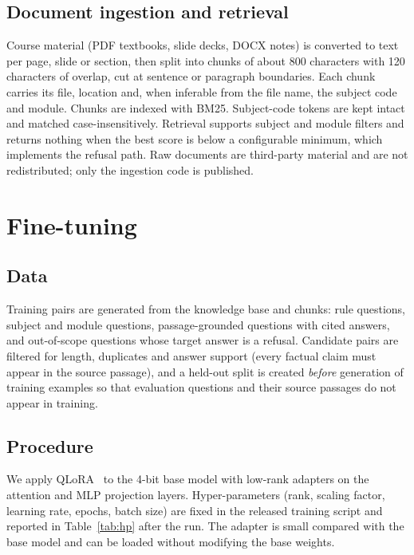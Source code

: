 \documentclass[conference]{IEEEtran}
\begin{document}
\subsection{Document ingestion and retrieval}
Course material (PDF textbooks, slide decks, DOCX notes) is converted to text per page, slide or section, then split into chunks of about 800 characters with 120 characters of overlap, cut at sentence or paragraph boundaries. Each chunk carries its file, location and, when inferable from the file name, the subject code and module. Chunks are indexed with BM25. Subject-code tokens are kept intact and matched case-insensitively. Retrieval supports subject and module filters and returns nothing when the best score is below a configurable minimum, which implements the refusal path. Raw documents are third-party material and are not redistributed; only the ingestion code is published.

\section{Fine-tuning}
\subsection{Data}
Training pairs are generated from the knowledge base and chunks: rule questions, subject and module questions, passage-grounded questions with cited answers, and out-of-scope questions whose target answer is a refusal. Candidate pairs are filtered for length, duplicates and answer support (every factual claim must appear in the source passage), and a held-out split is created \emph{before} generation of training examples so that evaluation questions and their source passages do not appear in training.

\subsection{Procedure}
We apply QLoRA~\cite{dettmers2023qlora} to the 4-bit base model with low-rank adapters on the attention and MLP projection layers. Hyper-parameters (rank, scaling factor, learning rate, epochs, batch size) are fixed in the released training script and reported in Table~\ref{tab:hp} after the run. The adapter is small compared with the base model and can be loaded without modifying the base weights.
\end{document}
